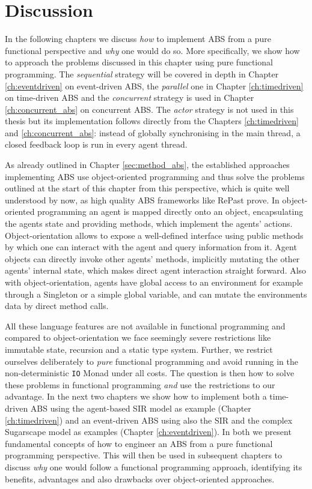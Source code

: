 \section{Discussion}
In the following chapters we discuss \textit{how} to implement ABS from a pure functional perspective and \textit{why} one would do so. More specifically, we show how to approach the problems discussed in this chapter using pure functional programming. The \textit{sequential} strategy will be covered in depth in Chapter \ref{ch:eventdriven} on event-driven ABS, the \textit{parallel} one in Chapter \ref{ch:timedriven} on time-driven ABS and the \textit{concurrent} strategy is used in Chapter \ref{ch:concurrent_abs} on concurrent ABS. The \textit{actor} strategy is not used in this thesis but its implementation follows directly from the Chapters \ref{ch:timedriven} and \ref{ch:concurrent_abs}: instead of globally synchronising in the main thread, a closed feedback loop is run in every agent thread. 

As already outlined in Chapter \ref{sec:method_abs}, the established approaches implementing ABS use object-oriented programming and thus solve the problems outlined at the start of this chapter from this perspective, which is quite well understood by now, as high quality ABS frameworks like RePast \cite{north_complex_2013} prove. In object-oriented programming an agent is mapped directly onto an object, encapsulating the agents state and providing methods, which implement the agents' actions. Object-orientation allows to expose a well-defined interface using public methods by which one can interact with the agent and query information from it. Agent objects can directly invoke other agents' methods, implicitly mutating the other agents' internal state, which makes direct agent interaction straight forward. Also with object-orientation, agents have global access to an environment for example through a Singleton \cite{gamma_design_1994} or a simple global variable, and can mutate the environments data by direct method calls.

All these language features are not available in functional programming and compared to object-orientation we face seemingly severe restrictions like immutable state, recursion and a static type system. Further, we restrict ourselves deliberately to \textit{pure} functional programming and avoid running in the non-deterministic \texttt{IO} Monad under all costs. The question is then how to solve these problems in functional programming \textit{and} use the restrictions to our advantage. In the next two chapters we show how to implement both a time-driven ABS  using the agent-based SIR model as example (Chapter \ref{ch:timedriven}) and an event-driven ABS using also the SIR and the complex Sugarscape model as examples (Chapter \ref{ch:eventdriven}). In both we present fundamental concepts of how to engineer an ABS from a pure functional programming perspective. This will then be used in subsequent chapters to discuss \textit{why} one would follow a  functional programming approach, identifying its benefits, advantages and also drawbacks over object-oriented approaches. 

